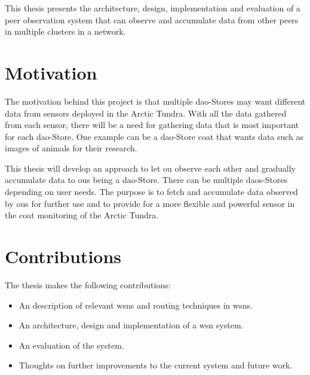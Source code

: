 \documentclass[USenglish]{uit-thesis}
\begin{document}

This thesis presents the architecture, design, implementation and evaluation of a peer observation system that can observe and accumulate data from other peers in multiple clusters in a network.


\section{Motivation}
The motivation behind this project is that multiple \gls{dao}-Stores \cite{dao} may want different data from sensors deployed in the Arctic Tundra. With all the data gathered from each sensor, there will be a need for gathering data that is most important for each \gls{dao}-Store. One example can be a \gls{dao}-Store \gls{coat} that wants data such as images of animals for their research.

This thesis will develop an approach to let \gls{ou} observe each other and gradually accumulate data to \glspl{ou} being a \gls{dao}-Store. There can be multiple \glspl{dao}-Stores depending on user needs. The purpose is to fetch and accumulate data observed by \glspl{ou} for further use and to provide for a more flexible and powerful sensor in the \gls{coat} monitoring of the Arctic Tundra.




\section{Contributions}
The thesis makes the following contributions:

\begin{itemize}
\item An description of relevant \glspl{wsn} and routing techniques in \glspl{wsn}.
\item An architecture, design and implementation of a \gls{wsn} system.
\item An evaluation of the system.
\item Thoughts on further improvements to the current system and future work.
\end{itemize}
\end{document}
